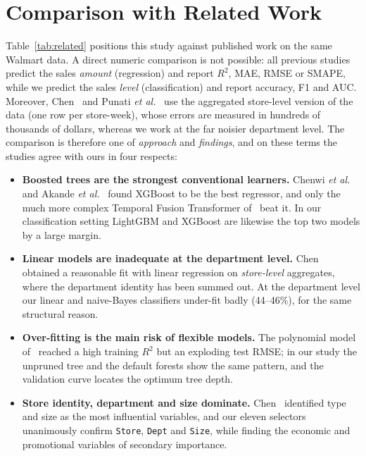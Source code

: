 \section{Comparison with Related Work}\label{sec:compare}
Table~\ref{tab:related} positions this study against published work on the same Walmart data. A direct numeric comparison is not possible: all previous studies predict the sales \emph{amount} (regression) and report $R^2$, MAE, RMSE or SMAPE, while we predict the sales \emph{level} (classification) and report accuracy, F1 and AUC. Moreover, Chen~\cite{chen2022} and Punati \emph{et al.}~\cite{punati2025} use the aggregated store-level version of the data (one row per store-week), whose errors are measured in hundreds of thousands of dollars, whereas we work at the far noisier department level. The comparison is therefore one of \emph{approach} and \emph{findings}, and on these terms the studies agree with ours in four respects:

\begin{itemize}
\item \textbf{Boosted trees are the strongest conventional learners.} Chenwi \emph{et al.}~\cite{chenwi2024} and Akande \emph{et al.}~\cite{akande2022} found XGBoost to be the best regressor, and only the much more complex Temporal Fusion Transformer of~\cite{punati2025} beat it. In our classification setting LightGBM and XGBoost are likewise the top two models by a large margin.
\item \textbf{Linear models are inadequate at the department level.} Chen~\cite{chen2022} obtained a reasonable fit with linear regression on \emph{store-level} aggregates, where the department identity has been summed out. At the department level our linear and naive-Bayes classifiers under-fit badly (44--46\%), for the same structural reason.
\item \textbf{Over-fitting is the main risk of flexible models.} The polynomial model of~\cite{chen2022} reached a high training $R^2$ but an exploding test RMSE; in our study the unpruned tree and the default forests show the same pattern, and the validation curve locates the optimum tree depth.
\item \textbf{Store identity, department and size dominate.} Chen~\cite{chen2022} identified type and size as the most influential variables, and our eleven selectors unanimously confirm \texttt{Store}, \texttt{Dept} and \texttt{Size}, while finding the economic and promotional variables of secondary importance.
\end{itemize}

